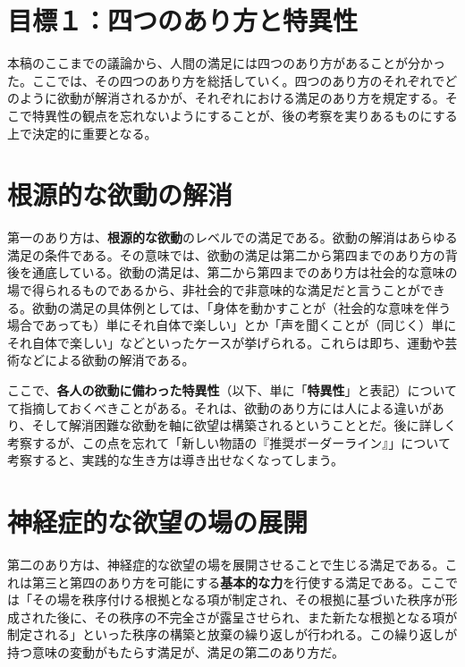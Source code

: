 \documentclass[
]{ltjsarticle}
\author{}
\date{}
\begin{document}
\section{目標１：四つのあり方と特異性}\label{ux76eeux6a19uxff11ux56dbux3064ux306eux3042ux308aux65b9ux3068ux7279ux7570ux6027}

本稿のここまでの議論から、人間の満足には四つのあり方があることが分かった。ここでは、その四つのあり方を総括していく。四つのあり方のそれぞれでどのように欲動が解消されるかが、それぞれにおける満足のあり方を規定する。そこで特異性の観点を忘れないようにすることが、後の考察を実りあるものにする上で決定的に重要となる。

\section{根源的な欲動の解消}\label{ux6839ux6e90ux7684ux306aux6b32ux52d5ux306eux89e3ux6d88}

第一のあり方は、\textbf{根源的な欲動}のレベルでの満足である。欲動の解消はあらゆる満足の条件である。その意味では、欲動の満足は第二から第四までのあり方の背後を通底している。欲動の満足は、第二から第四までのあり方は社会的な意味の場で得られるものであるから、非社会的で非意味的な満足だと言うことができる。欲動の満足の具体例としては、「身体を動かすことが（社会的な意味を伴う場合であっても）単にそれ自体で楽しい」とか「声を聞くことが（同じく）単にそれ自体で楽しい」などといったケースが挙げられる。これらは即ち、運動や芸術などによる欲動の解消である。

ここで、\textbf{各人の欲動に備わった特異性}（以下、単に「\textbf{特異性}」と表記）についてて指摘しておくべきことがある。それは、欲動のあり方には人による違いがあり、そして解消困難な欲動を軸に欲望は構築されるということとだ。後に詳しく考察するが、この点を忘れて「新しい物語の『推奨ボーダーライン』」について考察すると、実践的な生き方は導き出せなくなってしまう。

\section{神経症的な欲望の場の展開}\label{ux795eux7d4cux75c7ux7684ux306aux6b32ux671bux306eux5834ux306eux5c55ux958b}

第二のあり方は、神経症的な欲望の場を展開させることで生じる満足である。これは第三と第四のあり方を可能にする\textbf{基本的な力}を行使する満足である。ここでは「その場を秩序付ける根拠となる項が制定され、その根拠に基づいた秩序が形成された後に、その秩序の不完全さが露呈させられ、また新たな根拠となる項が制定される」といった秩序の構築と放棄の繰り返しが行われる。この繰り返しが持つ意味の変動がもたらす満足が、満足の第二のあり方だ。
\end{document}
